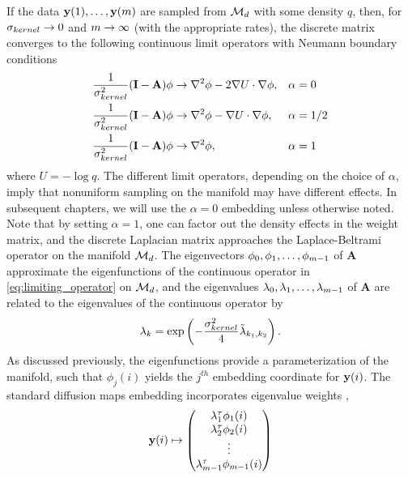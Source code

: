 If the data $\mathbf{y}(1), \dots, \mathbf{y}(m)$ are sampled from $\mathcal{M}_d$ with some density $q$, then, for $\sigma_{kernel} \rightarrow 0$ and $m \rightarrow \infty$ (with the appropriate rates), the discrete matrix converges to the following continuous limit operators with Neumann boundary conditions \cite{coifman2006geometric}
\begin{equation} \label{eq:limiting_operator}
\begin{aligned}
\frac{1}{\sigma_{kernel}^2}(\mathbf{I}-\mathbf{A}) \phi &\rightarrow \nabla^2 \phi - 2\nabla U \cdot \nabla \phi, &&\alpha = 0 \\
\frac{1}{\sigma_{kernel}^2}(\mathbf{I}-\mathbf{A}) \phi &\rightarrow \nabla^2 \phi - \nabla U \cdot \nabla \phi, &&\alpha = 1/2 \\
\frac{1}{\sigma_{kernel}^2}(\mathbf{I}-\mathbf{A}) \phi &\rightarrow \nabla^2 \phi, &&\alpha = 1
\end{aligned}
\end{equation}
where $U = - \log q$.
%
The different limit operators, depending on the choice of $\alpha$, imply that nonuniform sampling on the manifold may have different effects.
%
In subsequent chapters, we will use the $\alpha=0$ embedding unless otherwise noted.
%
Note that by setting $\alpha=1$, one can factor out the density effects in the weight matrix, and the discrete Laplacian matrix approaches the Laplace-Beltrami operator on the manifold $\mathcal{M}_d$.
%
The eigenvectors $\phi_0, \phi_1, \dots, \phi_{m-1}$ of $\mathbf{A}$ approximate the eigenfunctions of the continuous operator in \eqref{eq:limiting_operator} on $\mathcal{M}_d$,
and the eigenvalues $\lambda_0, \lambda_1, \dots, \lambda_{m-1}$ of $\mathbf{A}$ are related to the eigenvalues of the continuous operator by
\begin{equation} \label{eq:evals_relationship}
\lambda_k = \exp \left( -\frac{\sigma_{kernel}^2}{4} \tilde{\lambda}_{k_1, k_2}  \right).
\end{equation}
%
As discussed previously, the eigenfunctions provide a parameterization of the manifold, such that $\phi_{j}(i)$ yields the $j^{th}$ embedding coordinate for $\mathbf{y}(i)$.
%
The standard diffusion maps embedding incorporates eigenvalue weights \cite{coifman2005geometric, coifman2006geometric},
%
\begin{equation} \label{eq:dmaps_embed_full}
\mathbf{y}(i) \mapsto
\begin{pmatrix}
\lambda_1^\tau \phi_1(i) \\
\lambda_2^\tau \phi_2(i) \\
\vdots \\
\lambda_{m-1}^\tau  \phi_{m-1}(i)
\end{pmatrix}
\end{equation}
